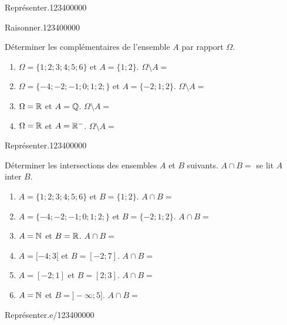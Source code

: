 \begin{pageAD}
\begin{ExoCad}{Représenter.}{1234}{0}{0}{0}{0}{0}
\begin{enumerate}
\end{enumerate}
 
\end{ExoCad}




\begin{ExoCad}{Raisonner.}{1234}{0}{0}{0}{0}{0}

Déterminer les complémentaires de l'ensemble $A$ par rapport $\Omega$. 
\begin{enumerate}
\item $\Omega = \lbrace 1;2;3;4;5;6\rbrace$ et $A = \lbrace 1;2 \rbrace$. $\Omega \setminus A = $
\item $\Omega = \lbrace -4;-2;-1;0;1;2;\rbrace$ et $A = \lbrace -2;1;2 \rbrace$.  $\Omega \setminus A = $
\item $\Omega = \mathbb R$ et $A = \mathbb Q$. $\Omega \setminus A = $
\item $\Omega = \mathbb R$ et $A = \mathbb R^-$. $\Omega \setminus A = $
\end{enumerate} 
 \end{ExoCad}


\begin{ExoCad}{Représenter.}{1234}{0}{0}{0}{0}{0}

Déterminer les intersections des ensembles $A$ et $B$ suivants.   $A \cap B = $ se lit $A$ inter $B$.
\begin{enumerate}
\item $A = \lbrace 1;2;3;4;5;6\rbrace$ et $B = \lbrace 1;2 \rbrace$. $A \cap B = $
\item $A = \lbrace -4;-2;-1;0;1;2;\rbrace$ et $B = \lbrace -2;1;2 \rbrace$.  $A \cap B = $
\item $A = \mathbb N$ et $B = \mathbb R$. $A \cap B = $ 
\item $A = [-4;3[$ et $B =[-2;7]$. $A \cap B = $ 
\item $A = [-2;1]$ et $B =[2;3]$. $A \cap B = $ 
\item $A = \mathbb N$ et $B =]-\infty;5]$. $A \cap B = $ 
\end{enumerate}
 
\end{ExoCad}









\begin{ExoCad}{Représenter.}{e/1234}{0}{0}{0}{0}{0}


\end{ExoCad}
\end{pageAD}
